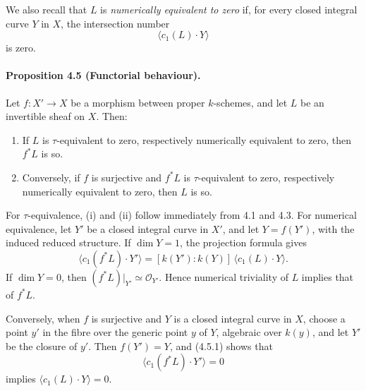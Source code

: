 \documentclass[12pt]{article}
\newcommand{\cO}{\mathcal O}
\begin{document}
We also recall that $L$ is \emph{numerically equivalent to zero} if, for every closed integral curve $Y$ in $X$, the intersection number
\[
\langle c_1(L)\cdot Y\rangle
\]
is zero.

\paragraph{Proposition 4.5 (Functorial behaviour).}
Let $f:X'\to X$ be a morphism between proper $k$-schemes, and let $L$ be an invertible sheaf on $X$. Then:
\begin{enumerate}[label=\roman*)]
\item If $L$ is $\tau$-equivalent to zero, respectively numerically equivalent to zero, then $f^*L$ is so.
\item Conversely, if $f$ is surjective and $f^*L$ is $\tau$-equivalent to zero, respectively numerically equivalent to zero, then $L$ is so.
\end{enumerate}

For $\tau$-equivalence, (i) and (ii) follow immediately from 4.1 and 4.3. For numerical equivalence, let $Y'$ be a closed integral curve in $X'$, and let $Y=f(Y')$, with the induced reduced structure. If $\dim Y=1$, the projection formula gives
\[
\langle c_1(f^*L)\cdot Y'\rangle
   =[k(Y'):k(Y)]\,\langle c_1(L)\cdot Y\rangle.
\tag{4.5.1}
\]
If $\dim Y=0$, then $(f^*L)|_{Y'}\simeq\cO_{Y'}$. Hence numerical triviality of $L$ implies that of $f^*L$.

Conversely, when $f$ is surjective and $Y$ is a closed integral curve in $X$, choose a point $y'$ in the fibre over the generic point $y$ of $Y$, algebraic over $k(y)$, and let $Y'$ be the closure of $y'$. Then $f(Y')=Y$, and (4.5.1) shows that
\[
\langle c_1(f^*L)\cdot Y'\rangle=0
\]
implies $\langle c_1(L)\cdot Y\rangle=0$.
\end{document}

